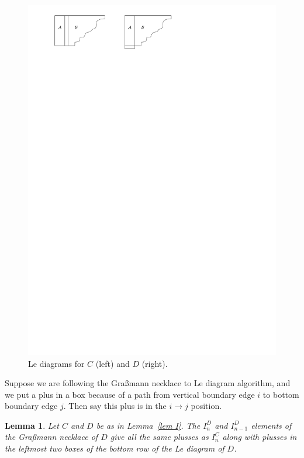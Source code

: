 \documentclass[11pt]{article}
\newtheorem{lem}[thm]{Lemma}
\theoremstyle{remark}
\theoremstyle{definition}
\begin{document}
\begin{figure}
  \includegraphics{Le_diagrams}
  \caption{Le diagrams for $C$ (left) and $D$ (right).}\label{fig Le}
\end{figure}

Suppose we are following the Gra\ss mann necklace to Le diagram algorithm, and we put a plus in a box because of a path from vertical boundary edge $i$ to bottom boundary edge $j$.  Then say this plus is in the $i\rightarrow j$ position.

\begin{lem}\label{lem n and n-1}
  Let $C$ and $D$ be as in Lemma~\ref{lem I}.
  The $I_n^{D}$ and $I_{n-1}^{D}$ elements of the Gra\ss mann necklace of $D$ give all the same plusses as $I_n^{C}$ along with plusses in the leftmost two boxes of the bottom row of the Le diagram of $D$.
\end{lem}
\end{document}
